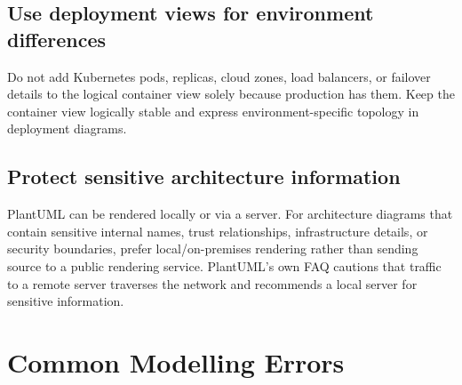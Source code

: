 \documentclass[11pt]{article}
\begin{document}
\subsection{Use deployment views for environment differences}

Do not add Kubernetes pods, replicas, cloud zones, load balancers, or failover details to the logical container view solely because production has them. Keep the container view logically stable and express environment-specific topology in deployment diagrams.\cite{c4containerdiagram,c4deployment}

\subsection{Protect sensitive architecture information}

PlantUML can be rendered locally or via a server. For architecture diagrams that contain sensitive internal names, trust relationships, infrastructure details, or security boundaries, prefer local/on-premises rendering rather than sending source to a public rendering service. PlantUML's own FAQ cautions that traffic to a remote server traverses the network and recommends a local server for sensitive information.\cite{plantumlfaq}

\section{Common Modelling Errors}
\end{document}
